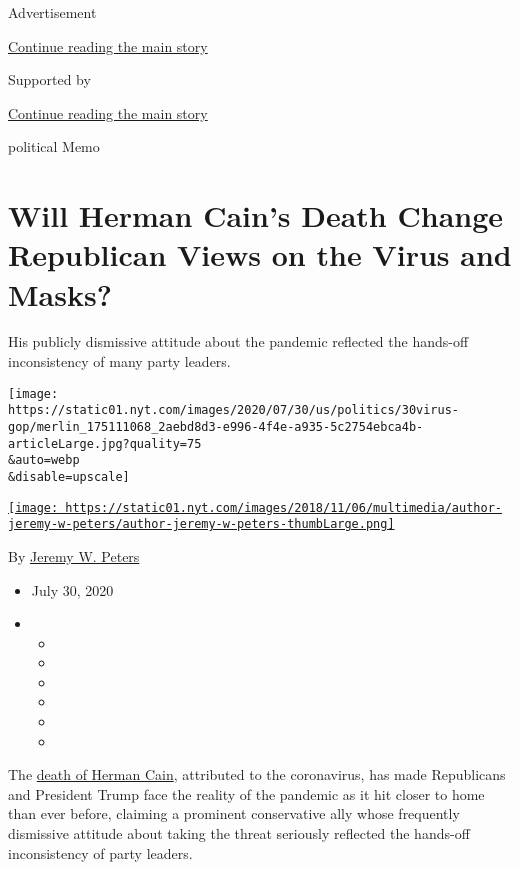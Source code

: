 Advertisement

\protect\hyperlink{after-top}{Continue reading the main story}

Supported by

\protect\hyperlink{after-sponsor}{Continue reading the main story}

political Memo

\hypertarget{will-herman-cains-death-change-republican-views-on-the-virus-and-masks}{%
\section{Will Herman Cain's Death Change Republican Views on the Virus
and
Masks?}\label{will-herman-cains-death-change-republican-views-on-the-virus-and-masks}}

His publicly dismissive attitude about the pandemic reflected the
hands-off inconsistency of many party leaders.

\texttt{[image: https://static01.nyt.com/images/2020/07/30/us/politics/30virus-gop/merlin\_175111068\_2aebd8d3-e996-4f4e-a935-5c2754ebca4b-articleLarge.jpg?quality=75\\\&auto=webp\\\&disable=upscale]}

\href{https://www.nytimes.com/by/jeremy-w-peters}{\texttt{[image: https://static01.nyt.com/images/2018/11/06/multimedia/author-jeremy-w-peters/author-jeremy-w-peters-thumbLarge.png]}}

By \href{https://www.nytimes.com/by/jeremy-w-peters}{Jeremy W. Peters}

\begin{itemize}
\item
  July 30, 2020
\item
  \begin{itemize}
  \item
  \item
  \item
  \item
  \item
  \item
  \end{itemize}
\end{itemize}

The
\href{https://www.nytimes.com/2020/07/30/us/politics/herman-cain-dead.html}{death
of Herman Cain}, attributed to the coronavirus, has made Republicans and
President Trump face the reality of the pandemic as it hit closer to
home than ever before, claiming a prominent conservative ally whose
frequently dismissive attitude about taking the threat seriously
reflected the hands-off inconsistency of party leaders.


